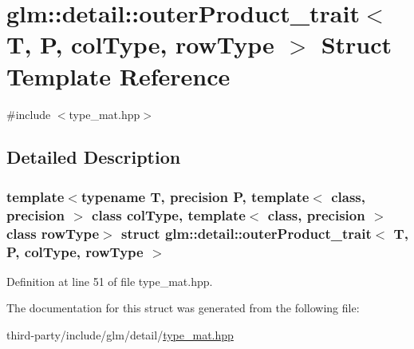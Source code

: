 \hypertarget{structglm_1_1detail_1_1outer_product__trait}{}\section{glm\+:\+:detail\+:\+:outer\+Product\+\_\+trait$<$ T, P, col\+Type, row\+Type $>$ Struct Template Reference}
\label{structglm_1_1detail_1_1outer_product__trait}


{\ttfamily \#include $<$type\+\_\+mat.\+hpp$>$}



\subsection{Detailed Description}
\subsubsection*{template$<$typename T, precision P, template$<$ class, precision $>$ class col\+Type, template$<$ class, precision $>$ class row\+Type$>$\newline
struct glm\+::detail\+::outer\+Product\+\_\+trait$<$ T, P, col\+Type, row\+Type $>$}



Definition at line 51 of file type\+\_\+mat.\+hpp.



The documentation for this struct was generated from the following file\+:\begin{DoxyCompactItemize}
\item 
third-\/party/include/glm/detail/\hyperlink{type__mat_8hpp}{type\+\_\+mat.\+hpp}\end{DoxyCompactItemize}
